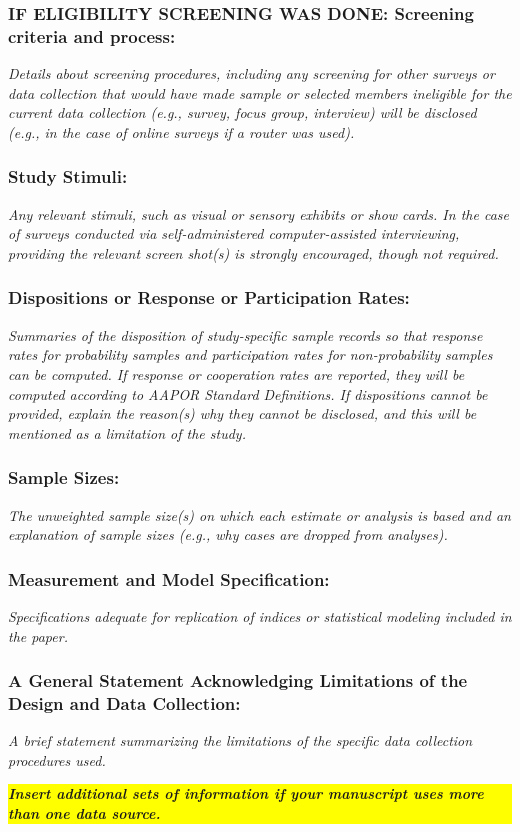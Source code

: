 \documentclass{article}
\begin{document}
\subsubsection*{IF ELIGIBILITY SCREENING WAS DONE: Screening criteria and process:} \textit{Details about screening procedures, including any screening for other surveys or data collection that would have made sample or selected members ineligible for the current data collection (e.g., survey, focus group, interview) will be disclosed (e.g., in the case of online surveys if a router was used).}



\subsubsection*{Study Stimuli:} \textit{Any relevant stimuli, such as visual or sensory exhibits or show cards. In the case of surveys conducted via self-administered computer-assisted interviewing, providing the relevant screen shot(s) is strongly encouraged, though not required.}



\subsubsection*{Dispositions or Response or Participation Rates:} \textit{Summaries of the disposition of study-specific sample records so that response rates for probability samples and participation rates for non-probability samples can be computed. If response or cooperation rates are reported, they will be computed according to AAPOR Standard Definitions. If dispositions cannot be provided, explain the reason(s) why they cannot be disclosed, and this will be mentioned as a limitation of the study.}



\subsubsection*{Sample Sizes:} \textit{The unweighted sample size(s) on which each estimate or analysis is based and an explanation of sample sizes (e.g., why cases are dropped from analyses).}



\subsubsection*{Measurement and Model Specification:} \textit{Specifications adequate for replication of indices or statistical modeling included in the paper.}



\subsubsection*{A General Statement Acknowledging Limitations of the Design and Data Collection:} \textit{A brief statement summarizing the limitations of the specific data collection procedures used.}


\medskip 

\colorbox{yellow}{\parbox[l]{.92 \textwidth}{
\bfseries \textit{
Insert additional sets of information if your manuscript uses more than one data source.
}}}
\end{document}
